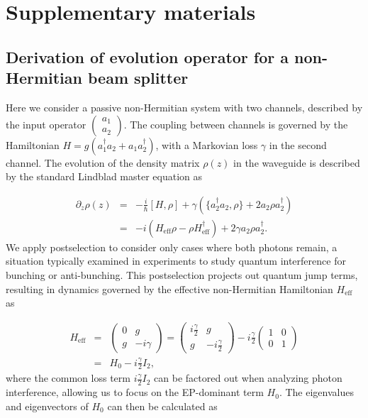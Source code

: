 \documentclass[%
reprint,
superscriptaddress,
amsthm,amsmath,amssymb,
aps,
]{revtex4-1}
\begin{document}
\section*{Supplementary materials}

\subsection{\label{sec:level51}Derivation of evolution operator for a non-Hermitian beam splitter }

Here we consider a passive non-Hermitian system with two channels, described by the input operator $\begin{pmatrix} a_1 \\ a_2 \end{pmatrix}$. The coupling between channels is governed by the Hamiltonian $H=g(a_1^\dagger a_2 + a_1 a_2^\dagger)$, with a Markovian loss $\gamma$ in the second channel. The evolution of the density matrix $\rho(z)$ in the waveguide is described by the standard Lindblad master equation as

\begin{eqnarray}
	\partial_{z}\rho(z)&=&-\frac{i}{\hbar}[H,\rho]+\gamma(\{a_{2}^{\dagger}a_{2},\rho\}+2a_{2}\rho a_{2}^{\dagger})\nonumber\\&=&-i(H_{\text{eff}}\rho-\rho H_{\text{eff}}^{\dagger})+2\gamma a_{2}\rho a_{2}^{\dagger}\label{1}.
\end{eqnarray}
We apply postselection to consider only cases where both photons remain, a situation typically examined in experiments to study quantum interference for bunching or anti-bunching. This postselection projects out quantum jump terms, resulting in dynamics governed by the effective non-Hermitian Hamiltonian $H_{\text{eff}}$ as

\begin{eqnarray}
	H_{\text{eff}}	 &=&\begin{pmatrix} 0 & g \\
		g & -i \gamma	\end{pmatrix} 
	=\begin{pmatrix} i \frac{\gamma}{2} & g \\
		g & -i \frac{\gamma}{2} \end{pmatrix}	-  i \frac{\gamma}{2} \begin{pmatrix} 1 &0 \\
		0 & 1 \end{pmatrix}\nonumber\\&=&H_{0}	-  i \frac{\gamma}{2} I_{2},
\end{eqnarray}
where the common loss term $i\frac{\gamma}{2}I_2$ can be factored out when analyzing photon interference, allowing us to focus on the EP-dominant term $H_0$. The eigenvalues and eigenvectors of $H_0$ can then be calculated as
\end{document}
